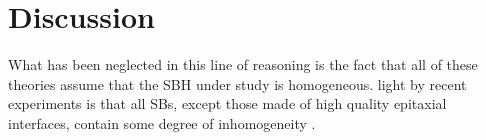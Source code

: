 \section{Discussion}
What has been neglected in this line of reasoning is the fact that all of these theories assume that the SBH under study is homogeneous.
light by recent experiments is that all SBs, except those made of high quality epitaxial interfaces,
contain some degree of inhomogeneity \cite{tung_recent_2001}.